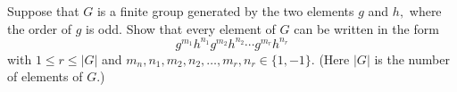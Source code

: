 Suppose that $G$ is a finite group generated by the two elements $g$ and $h,$ where the order of $g$ is odd. Show that every element of $G$ can be written in the form
\[g^{m_1}h^{n_1}g^{m_2}h^{n_2}\cdots g^{m_r}h^{n_r}\]with $1\le r\le |G|$ and $m_n,n_1,m_2,n_2,\dots,m_r,n_r\in\{1,-1\}.$ (Here $|G|$ is the number of elements of $G.$)